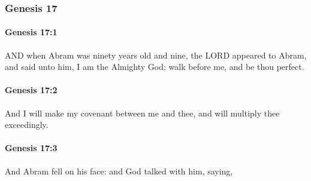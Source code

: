 	\subsubsection{Genesis 17} %
		\label{GENESIS-17}
		
		\paragraph{Genesis 17:1} %
			\label{GENESIS-17-1}

			AND when Abram was ninety years old and nine, the LORD appeared to Abram, and said unto him, I am the Almighty God; walk before me, and be thou perfect.


		\paragraph{Genesis 17:2} %
			\label{GENESIS-17-2}

			And I will make my covenant between me and thee, and will multiply thee exceedingly.


		\paragraph{Genesis 17:3} %
			\label{GENESIS-17-3}

			And Abram fell on his face: and God talked with him, saying,


